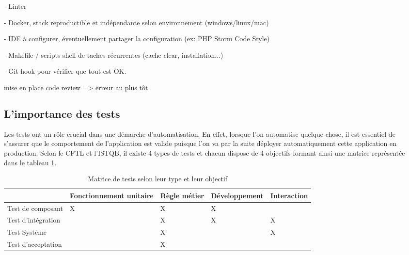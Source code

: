 -  Linter

-  Docker, stack reproductible et indépendante selon environnement (windows/linux/mac) 

- IDE à configurer, éventuellement partager la configuration (ex: PHP Storm Code Style)

-  Makefile / scripts shell de taches récurrentes (cache clear, installation...)

- Git hook pour vérifier que tout est OK.

mise en place code review => erreur au plus tôt

\subsection{L'importance des tests} \label{importance-test}

Les tests ont un rôle crucial dans une démarche d'automatisation. En effet, lorsque l'on automatise quelque chose, il est essentiel de s'assurer que le comportement de l'application est valide puisque l'on va par la suite déployer automatiquement cette application en production. Selon le \gls{CFTL} et l'\gls{ISTQB}, il existe 4 types de tests et chacun dispose de 4 objectifs formant ainsi une matrice représentée dans le tableau \ref{tab:matrice-test}.


\begin{table}[H]
	\centering
	\begin{adjustbox}{width=0.95\textwidth,center=\textwidth} 
		\begin{tabular}{|l|l|l|l|l|}
			\hline
			\diagbox{type de test}{valide} & Fonctionnement unitaire & Règle métier & Développement & Interaction \\ \hline
			Test de composant     & X                       & X            & X              &             \\ \hline
			Test d'intégration    &                         & X            & X              & X           \\ \hline
			Test Système          &                         & X            &               & X           \\ \hline
			Test d'acceptation    &                         & X            &               &             \\ \hline
		\end{tabular}
	\end{adjustbox}
	\caption{Matrice de tests selon leur type et leur objectif}
	\label{tab:matrice-test}
\end{table}

